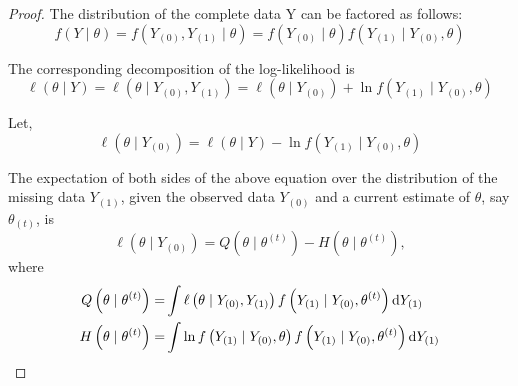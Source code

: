 \begin{proof}
	The distribution of the complete data Y can be factored as follows:
	\begin{equation}
		f(Y \mid \theta)=f\left(Y_{(0)}, Y_{(1)} \mid \theta\right)=f\left(Y_{(0)} \mid \theta\right) f\left(Y_{(1)} \mid Y_{(0)}, \theta\right)
	\end{equation}

	The corresponding decomposition of the log-likelihood is
	\begin{equation}
		\ell(\theta \mid Y)=\ell\left(\theta \mid Y_{(0)}, Y_{(1)}\right)=\ell\left(\theta \mid Y_{(0)}\right)+\ln f\left(Y_{(1)} \mid Y_{(0)}, \theta\right)
	\end{equation}

	Let,
	\begin{equation}
		\ell\left(\theta \mid Y_{(0)}\right)=\ell(\theta \mid Y)-\ln f\left(Y_{(1)} \mid Y_{(0)}, \theta\right)
	\end{equation}

	The expectation of both sides of the above equation over the distribution of the missing data \(Y_{(1)}\), given the observed data \(Y_{(0)}\) and a current estimate of \(\theta\), say \(\theta_{(t)}\), is
	\begin{equation}
		\ell\left(\theta \mid Y_{(0)}\right)=Q\left(\theta \mid \theta^{(t)}\right)-H\left(\theta \mid \theta^{(t)}\right),
	\end{equation}
	where
	\begin{equation}
		\begin{aligned}
			Q\left(\theta \mid \theta^{(t)}\right)= & \int\ell\left(\theta \mid Y_{(0)}, Y_{(1)}\right) f\left(Y_{(1)} \mid Y_{(0)}, \theta^{(t)}\right) \mathop{}\!\mathrm{d} Y_{(1)} \\
			H\left(\theta\mid\theta^{(t)}\right)=   & \int\ln f\left(Y_{(1)}\mid Y_{(0)},\theta\right)f\left(Y_{(1)} \mid Y_{(0)}, \theta^{(t)}\right) \mathop{}\!\mathrm{d} Y_{(1)}
		\end{aligned}
	\end{equation}


\end{proof}
